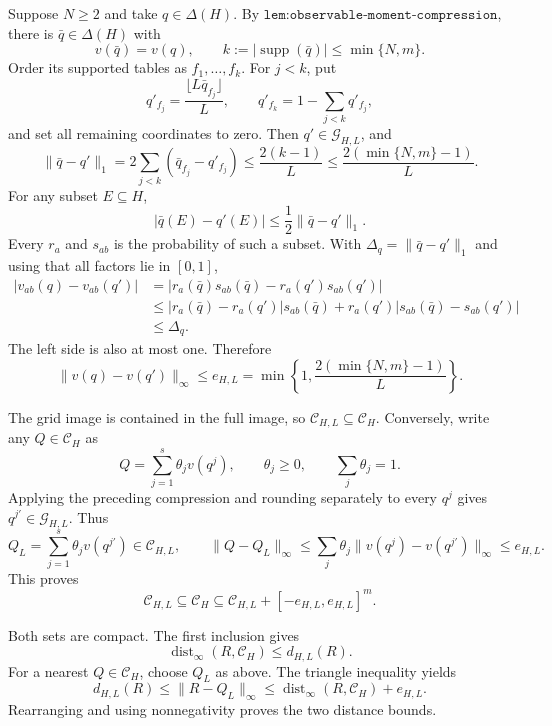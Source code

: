 Suppose \(N\ge2\) and take \(q\in\Delta(H)\).  By \(\texttt{lem:observable-moment-compression}\), there is \(\bar q\in\Delta(H)\) with
\[
 v(\bar q)=v(q),
 \qquad
 k:=|\operatorname{supp}(\bar q)|
 \le\min\{N,m\}.
\]
Order its supported tables as \(f_1,\ldots,f_k\).  For \(j<k\), put
\[
 q'_{f_j}=\frac{\lfloor L\bar q_{f_j}\rfloor}{L},
 \qquad
 q'_{f_k}=1-\sum_{j<k}q'_{f_j},
\]
and set all remaining coordinates to zero.  Then \(q'\in\mathcal G_{H,L}\), and
\[
 \|\bar q-q'\|_1
 =2\sum_{j<k}\left(\bar q_{f_j}-q'_{f_j}\right)
 \le\frac{2(k-1)}{L}
 \le\frac{2(\min\{N,m\}-1)}{L}.
\]
For any subset \(E\subseteq H\),
\[
 |\bar q(E)-q'(E)|
 \le\frac12\|\bar q-q'\|_1.
\]
Every \(r_a\) and \(s_{ab}\) is the probability of such a subset.  With \(\Delta_q=\|\bar q-q'\|_1\) and using that all factors lie in \([0,1]\),
\[
 \begin{aligned}
 |v_{ab}(q)-v_{ab}(q')|
 &=|r_a(\bar q)s_{ab}(\bar q)-r_a(q')s_{ab}(q')|\\
 &\le |r_a(\bar q)-r_a(q')|s_{ab}(\bar q)
      +r_a(q')|s_{ab}(\bar q)-s_{ab}(q')|\\
 &\le\Delta_q.
 \end{aligned}
\]
The left side is also at most one.  Therefore
\[
 \|v(q)-v(q')\|_\infty
 \le e_{H,L}
 =\min\left\{1,\frac{2(\min\{N,m\}-1)}{L}\right\}.
\]

The grid image is contained in the full image, so \(\mathcal C_{H,L}\subseteq\mathcal C_H\).  Conversely, write any \(Q\in\mathcal C_H\) as
\[
 Q=\sum_{j=1}^{s}\theta_jv(q^j),
 \qquad \theta_j\ge0,
 \qquad \sum_j\theta_j=1.
\]
Applying the preceding compression and rounding separately to every \(q^j\) gives \(q^{j\prime}\in\mathcal G_{H,L}\).  Thus
\[
 Q_L=\sum_{j=1}^{s}\theta_jv(q^{j\prime})\in\mathcal C_{H,L},
 \qquad
 \|Q-Q_L\|_\infty
 \le\sum_j\theta_j\|v(q^j)-v(q^{j\prime})\|_\infty
 \le e_{H,L}.
\]
This proves
\[
 \mathcal C_{H,L}\subseteq\mathcal C_H
 \subseteq\mathcal C_{H,L}+[-e_{H,L},e_{H,L}]^m.
\]

Both sets are compact.  The first inclusion gives
\[
 \operatorname{dist}_\infty(R,\mathcal C_H)\le d_{H,L}(R).
\]
For a nearest \(Q\in\mathcal C_H\), choose \(Q_L\) as above.  The triangle inequality yields
\[
 d_{H,L}(R)
 \le\|R-Q_L\|_\infty
 \le\operatorname{dist}_\infty(R,\mathcal C_H)+e_{H,L}.
\]
Rearranging and using nonnegativity proves the two distance bounds.

